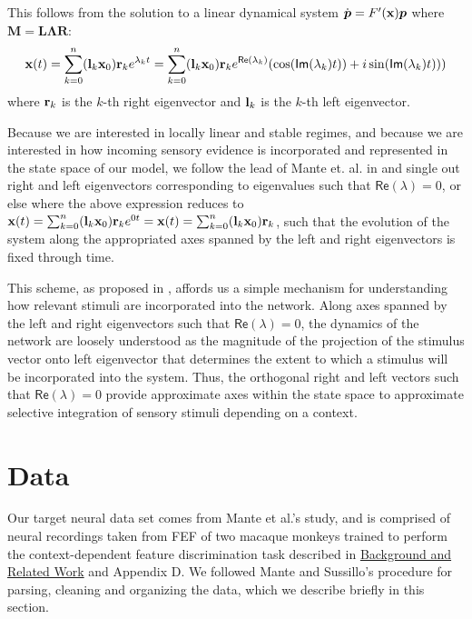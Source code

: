 \documentclass[12pt,a4paper,final]{iopart}
\begin{document}
This follows from the solution to a linear dynamical system $\dot{\boldsymbol{p}} = F'({\bf x})\boldsymbol{p}$ where $\boldsymbol{M} = \boldsymbol{L} \boldsymbol{\Lambda} \boldsymbol{R}$:
\[
    {\bf x}(t) = \sum_{k = 0}^n ({\bf l}_k {\bf x}_0) {\bf r}_k e^{\lambda_k t} = \sum_{k = 0}^n ({\bf l}_k {\bf x}_0) {\bf r}_k e^{\mathsf{Re}(\lambda_k)}(\cos(\mathsf{Im}(\lambda_k) t)) + i \sin(\mathsf{Im}(\lambda_k) t)))
\]
where ${\bf r}_k$ is the $k$-th right eigenvector and ${\bf l}_k$ is the $k$-th left eigenvector.

Because we are interested in locally linear and stable regimes, and because we are interested in how incoming sensory evidence is incorporated and represented in the state space of our model, we follow the lead of Mante et. al. in \cite{Mante2013} and single out right and left eigenvectors corresponding to eigenvalues such that $\mathsf{Re}(\lambda) = 0$, or else where the above expression reduces to ${\bf x}(t) = \sum_{k = 0}^n ({\bf l}_k {\bf x}_0) {\bf r}_k e^{0 t} = {\bf x}(t) = \sum_{k = 0}^n ({\bf l}_k {\bf x}_0) {\bf r}_k$, such that the evolution of the system along the appropriated axes spanned by the left and right eigenvectors is fixed through time.

This scheme, as proposed in \cite{Mante2013}, affords us a simple mechanism for understanding how relevant stimuli are incorporated into the network. Along axes spanned by the left and right eigenvectors such that $\mathsf{Re}(\lambda) = 0$, the dynamics of the network are loosely understood as the magnitude of the projection of the stimulus vector onto left eigenvector that determines the extent to which a stimulus will be incorporated into the system. Thus, the orthogonal right and left vectors such that $\mathsf{Re}(\lambda) = 0$ provide approximate axes within the state space to approximate selective integration of sensory stimuli depending on a context.

\section{Data}
\label{sec:data}
Our target neural data set comes from Mante et al.'s study, and is comprised of neural recordings taken from FEF of two macaque monkeys trained to perform the context-dependent feature discrimination task described in \hyperref[sec:back]{Background and Related Work} and Appendix D. We followed Mante and Sussillo's procedure for parsing, cleaning and organizing the data, which we describe briefly in this section.
\end{document}
